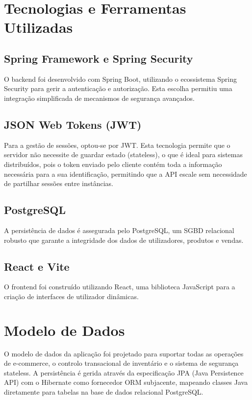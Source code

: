 \documentclass[11pt,a4paper,oneside]{report}
\begin{document}
\chapter{Tecnologias e Ferramentas Utilizadas}

\section{Spring Framework e Spring Security}
O backend foi desenvolvido com Spring Boot, utilizando o ecossistema Spring Security para gerir a autenticação e autorização. Esta escolha permitiu uma integração simplificada de mecanismos de segurança avançados.

\section{JSON Web Tokens (JWT)}
Para a gestão de sessões, optou-se por JWT. Esta tecnologia permite que o servidor não necessite de guardar estado (stateless), o que é ideal para sistemas distribuídos, pois o token enviado pelo cliente contém toda a informação necessária para a sua identificação, permitindo que a API escale sem necessidade de partilhar sessões entre instâncias.

\section{PostgreSQL}
A persistência de dados é assegurada pelo PostgreSQL, um SGBD relacional robusto que garante a integridade dos dados de utilizadores, produtos e vendas.

\section{React e Vite}
O frontend foi construído utilizando React, uma biblioteca JavaScript para a criação de interfaces de utilizador dinâmicas.

\chapter{Modelo de Dados}

O modelo de dados da aplicação foi projetado para suportar todas as operações de e-commerce, o controlo transacional de inventário e o sistema de segurança stateless. A persistência é gerida através da especificação JPA (Java Persistence API) com o Hibernate como fornecedor ORM subjacente, mapeando classes Java diretamente para tabelas na base de dados relacional PostgreSQL.
\end{document}
